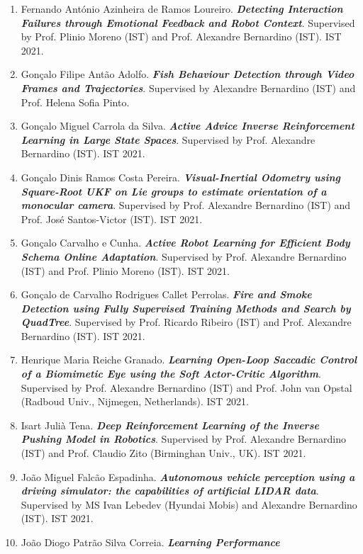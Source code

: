 \begin{enumerate}
  Alexandre Bernardino (IST). IST 2021.
\item
  Fernando António Azinheira de Ramos Loureiro. \emph{\textbf{Detecting
  Interaction Failures through Emotional Feedback and Robot Context}}.
  Supervised by Prof. Plinio Moreno (IST) and Prof. Alexandre Bernardino
  (IST). IST 2021.
\item
  Gonçalo Filipe Antão Adolfo. \emph{\textbf{Fish Behaviour Detection
  through Video Frames and Trajectories}}. Supervised by Alexandre
  Bernardino (IST) and Prof. Helena Sofia Pinto.
\item
  Gonçalo Miguel Carrola da Silva. \emph{\textbf{Active Advice Inverse
  Reinforcement Learning in Large State Spaces}}. Supervised by Prof.
  Alexandre Bernardino (IST). IST 2021.
\item
  Gonçalo Dinis Ramos Costa Pereira. \emph{\textbf{Visual-Inertial
  Odometry using Square-Root UKF on Lie groups to estimate orientation
  of a monocular camera}}. Supervised by Prof. Alexandre Bernardino
  (IST) and Prof. José Santos-Victor (IST). IST 2021.
\item
  Gonçalo Carvalho e Cunha. \emph{\textbf{Active Robot Learning for
  Efficient Body Schema Online Adaptation}}. Supervised by Prof.
  Alexandre Bernardino (IST) and Prof. Plinio Moreno (IST). IST 2021.
\item
  Gonçalo de Carvalho Rodrigues Callet Perrolas. \emph{\textbf{Fire and
  Smoke Detection using Fully Supervised Training Methods and Search by
  QuadTree}}. Supervised by Prof. Ricardo Ribeiro (IST) and Prof.
  Alexandre Bernardino (IST). IST 2021.
\item
  Henrique Maria Reiche Granado. \emph{\textbf{Learning Open-Loop
  Saccadic Control of a Biomimetic Eye using the Soft Actor-Critic
  Algorithm}}. Supervised by Prof. Alexandre Bernardino (IST) and Prof.
  John van Opstal (Radboud Univ., Nijmegen, Netherlands). IST 2021.
\item
  Isart Julià Tena. \emph{\textbf{Deep Reinforcement Learning of the
  Inverse Pushing Model in Robotics}}. Supervised by Prof. Alexandre
  Bernardino (IST) and Prof. Claudio Zito (Birminghan Univ., UK). IST
  2021.
\item
  João Miguel Falcão Espadinha. \emph{\textbf{Autonomous vehicle
  perception using a driving simulator: the capabilities of artificial
  LIDAR data}}. Supervised by MS Ivan Lebedev (Hyundai Mobis) and
  Alexandre Bernardino (IST). IST 2021.
\item
  João Diogo Patrão Silva Correia. \emph{\textbf{Learning Performance
}}
\end{enumerate}
